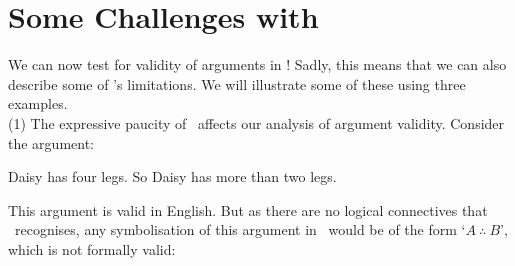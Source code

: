 \documentclass[PHIL101-Textbook.tex]{subfiles}
\begin{document}
%
%  
%
%
%
%

\pagebreak




\section{Some Challenges with \tfl}\label{s:ParadoxesOfMaterialConditional}
We can now test for validity of arguments in \tfl! Sadly, this means that we can also describe some of \tfl's limitations. We will illustrate some of these using three examples. \\


(1) The expressive paucity of \tfl\ affects our analysis of argument validity. Consider the argument: 
\begin{earg}
\item Daisy has four legs. So Daisy has more than two legs.
\end{earg}
This argument is valid in English. But as there are no logical connectives that \tfl\ recognises, any symbolisation of this argument in \tfl\ would be of the form `$A\ \therefore \ B$',  which is not formally valid:
\end{document}
